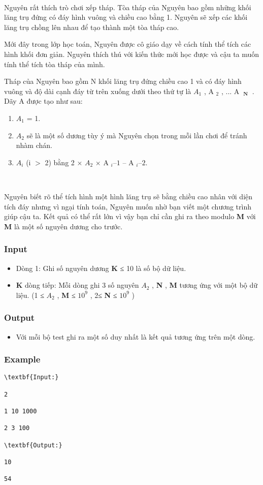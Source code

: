 

 

Nguyên rất thích trò chơi xếp tháp. Tòa tháp của Nguyên bao gồm những khối lăng trụ đứng có đáy hình vuông và chiều cao bằng 1. Nguyên sẽ xếp các khối lăng trụ chồng lên nhau để tạo thành một tòa tháp cao.

Mới đây trong lớp học toán, Nguyên được cô giáo dạy về cách tính thể tích các hình khối đơn giản. Nguyên thích thú với kiến thức mới học được và cậu ta muốn tính thể tích tòa tháp của mình.

Tháp của Nguyên bao gồm N khối lăng trụ đứng chiều cao 1 và có đáy hình vuông và độ dài cạnh đáy từ trên xuống dưới theo thứ tự là $A_{1}$ , A­­­ $_ 2 $ , ... A­­ $_\textbf{ N }$ . Dãy A được tạo như sau:
\begin{enumerate}
	\item $A_{1}$ = 1.
	\item $A_{2}$ sẽ là một số dương tùy ý mà Nguyên chọn trong mỗi lần chơi để tránh nhàm chán.
	\item $A_{i}$ (i $>$ 2) bằng 2 × $A_{2}$ × A $_ i  – 1 $ – A­ $_ i – 2. $
\end{enumerate}

 

Nguyên biết rõ thể tích hình một hình lăng trụ sẽ bằng chiều cao nhân với diện tích đáy nhưng vì ngại tính toán, Nguyên muốn nhờ bạn viết một chương trình giúp cậu ta. Kết quả có thể rất lớn vì vậy bạn chỉ cần ghi ra theo modulo \textbf{ M } với \textbf{ M } là một số nguyên dương cho trước.

\subsubsection{Input}
\begin{itemize}
	\item Dòng 1: Ghi số nguyên dương \textbf{ K } ≤ 10 là số bộ dữ liệu.
	\item \textbf{K } dòng tiếp: Mỗi dòng ghi 3 số nguyên $A_{2}$ , \textbf{ N } , \textbf{ M } tương ứng với một bộ dữ liệu. (1 ≤ $A_{2}$ , \textbf{ M } ≤ $10^{9}$ , 2≤ \textbf{ N } ≤ $10^{9}$ )
\end{itemize}

\subsubsection{Output}
\begin{itemize}
	\item Với mỗi bộ test ghi ra một số duy nhất là kết quả tương ứng trên một dòng.
\end{itemize}

\subsubsection{Example}
\begin{verbatim}
\textbf{Input:}

2

1 10 1000

2 3 100

\textbf{Output:}

10

54\end{verbatim}
